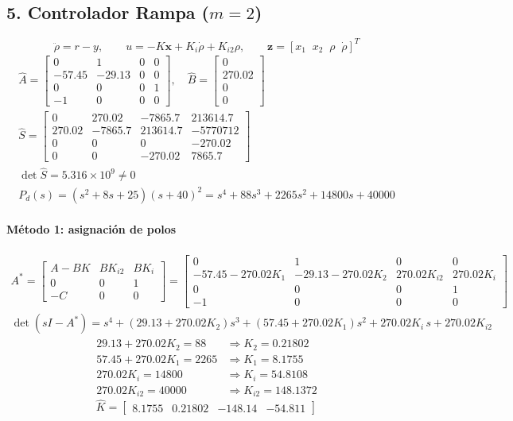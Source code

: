 \documentclass[11pt]{article}
\begin{document}
\subsection*{5. Controlador Rampa ($m=2$)}
\[\ddot\rho=r-y,\qquad u=-K\mathbf{x}+K_i\dot\rho+K_{i2}\rho,\qquad \mathbf{z}=[x_1\;\;x_2\;\;\rho\;\;\dot\rho]^T\]
\begin{gather*}
\hat{A}=\begin{bmatrix}0 & 1 & 0 & 0 \\ -57.45 & -29.13 & 0 & 0 \\ 0 & 0 & 0 & 1 \\ -1 & 0 & 0 & 0\end{bmatrix},\quad \hat{B}=\begin{bmatrix}0 \\ 270.02 \\ 0 \\ 0\end{bmatrix}\\
\hat{S}=\begin{bmatrix}0 & 270.02 & -7865.7 & 213614.7 \\ 270.02 & -7865.7 & 213614.7 & -5770712 \\ 0 & 0 & 0 & -270.02 \\ 0 & 0 & -270.02 & 7865.7\end{bmatrix}\\
\det\hat{S}=5.316\times10^{9}\neq0\\
P_d(s)=(s^2+8s+25)(s+40)^2=s^{4} + 88s^{3} + 2265s^{2} + 14800s + 40000
\end{gather*}
\paragraph{Método 1: asignación de polos}
\begin{gather*}
A^*=\begin{bmatrix}A-BK&BK_{i2}&BK_i\\0&0&1\\-C&0&0\end{bmatrix}=\begin{bmatrix}0&1&0&0\\-57.45-270.02K_1&-29.13-270.02K_2&270.02K_{i2}&270.02K_i\\0&0&0&1\\-1&0&0&0\end{bmatrix}\\
\det(sI-A^*)=s^4+(29.13+270.02K_2)s^3+(57.45+270.02K_1)s^2+270.02K_i\,s+270.02K_{i2}
\end{gather*}
\begin{align*}
29.13+270.02K_2=88 &\Rightarrow K_2=0.21802\\
57.45+270.02K_1=2265 &\Rightarrow K_1=8.1755\\
270.02K_i=14800 &\Rightarrow K_i=54.8108\\
270.02K_{i2}=40000 &\Rightarrow K_{i2}=148.1372
\end{align*}
\[\hat{K}=\begin{bmatrix}8.1755 & 0.21802 & -148.14 & -54.811\end{bmatrix}\]
\end{document}

